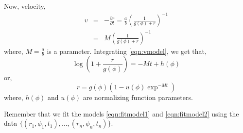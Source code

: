 \documentclass[12pt]{article}
\begin{document}
Now, velocity,
\begin{eqnarray}
\nonumber
v & = & -\frac{\partial r}{\partial t} = \frac{a}{b}\left(\frac{1}{g(\phi) + r}\right)^{-1} \\
\label{eqn:vmodel}
 & = & M \left(\frac{1}{g(\phi) + r}\right)^{-1}
\end{eqnarray}
where, $M=\frac{a}{b}$ is a parameter. Integrating \eqref{eqn:vmodel}, we get that,
\begin{equation}
\label{eqn:fitmodel1}
\log\left(1 + \frac{r}{g(\phi)}\right) = -Mt + h(\phi)
\end{equation}
or,
\begin{equation}
\label{eqn:fitmodel2}
r = g(\phi)\left(1 - u(\phi)\exp^{-Mt}\right)
\end{equation}
where, $h(\phi)$ and $u(\phi)$ are normalizing function parameters.

Remember that we fit the models \eqref{eqn:fitmodel1} and \eqref{eqn:fitmodel2} using the data $\{(r_1, \phi_1, t_1), \ldots, (r_n, \phi_n, t_n)\}$.
\end{document}
